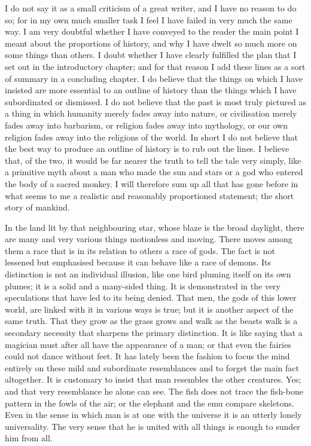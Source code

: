 I do not say it as a small criticism of a great writer, and I have no reason to do so; for in my own much smaller task I feel I have failed in very much the same way. I am very doubtful whether I have conveyed to the reader the main point I meant about the proportions of history, and why I have dwelt so much more on some things than others. I doubt whether I have clearly fulfilled the plan that I set out in the introductory chapter; and for that reason I add these lines as a sort of summary in a concluding chapter. I do believe that the things on which I have insisted are more essential to an outline of history than the things which I have subordinated or dismissed. I do not believe that the past is most truly pictured as a thing in which humanity merely fades away into nature, or civilisation merely fades away into barbarism, or religion fades away into mythology, or our own religion fades away into the religions of the world. In short I do not believe that the best way to produce an outline of history is to rub out the lines. I believe that, of the two, it would be far nearer the truth to tell the tale very simply, like a primitive myth about a man who made the sun and stars or a god who entered the body of a sacred monkey. I will therefore sum up all that has gone before in what seems to me a realistic and reasonably proportioned statement; the short story of mankind.

In the land lit by that neighbouring star, whose blaze is the broad daylight, there are many and very various things motionless and moving. There moves among them a race that is in its relation to others a race of gods. The fact is not lessened but emphasised because it can behave like a race of demons. Its distinction is not an individual illusion, like one bird pluming itself on its own plumes; it is a solid and a many-sided thing. It is demonstrated in the very speculations that have led to its being denied. That men, the gods of this lower world, are linked with it in various ways is true; but it is another aspect of the same truth. That they grow as the grass grows and walk as the beasts walk is a secondary necessity that sharpens the primary distinction. It is like saying that a magician must after all have the appearance of a man; or that even the fairies could not dance without feet. It has lately been the fashion to focus the mind entirely on these mild and subordinate resemblances and to forget the main fact altogether. It is customary to insist that man resembles the other creatures. Yes; and that very resemblance he alone can see. The fish does not trace the fish-bone pattern in the fowls of the air; or the elephant and the emu compare skeletons. Even in the sense in which man is at one with the universe it is an utterly lonely universality. The very sense that he is united with all things is enough to sunder him from all.

